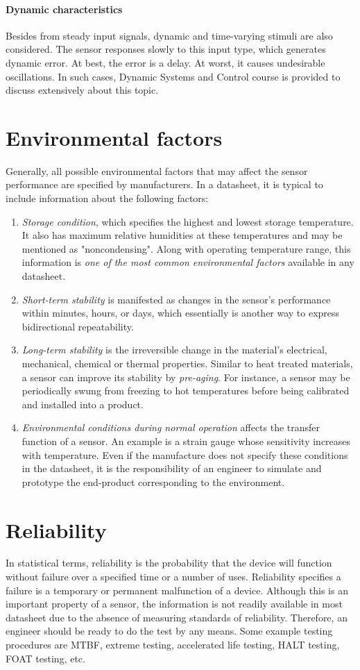 \paragraph{Dynamic characteristics}
Besides from steady input signals, dynamic and time-varying stimuli are also considered. The sensor responses slowly to this input type, which generates dynamic error. At best, the error is a delay. At worst, it causes undesirable oscillations. In such cases, Dynamic Systems and Control course is provided to discuss extensively about this topic.
\section{Environmental factors}
Generally, all possible environmental factors that may affect the sensor performance are specified by manufacturers. In a datasheet, it is typical to include information about the following factors:
\begin{enumerate}
	\item \textit{Storage condition}, which specifies the highest and lowest storage temperature. It also has maximum relative humidities at these temperatures and may be mentioned as "noncondensing". Along with operating temperature range, this information is \textit{one of the most common environmental factors} available in any datasheet. 
	\item \textit{Short-term stability} is manifested as changes in the sensor's performance within minutes, hours, or days, which essentially is another way to express bidirectional repeatability.
	\item \textit{Long-term stability} is the irreversible change in the material's electrical, mechanical, chemical or thermal properties. Similar to heat treated materials, a sensor can improve its stability by \textit{pre-aging}. For instance, a sensor may be periodically swung from freezing to hot temperatures before being calibrated and installed into a product.
	\item \textit{Environmental conditions during normal operation} affects the transfer function of a sensor. An example is a strain gauge whose sensitivity increases with temperature. Even if the manufacture does not specify these conditions in the datasheet, it is the responsibility of an engineer to simulate and prototype the end-product corresponding to the environment.
\end{enumerate}
\section{Reliability}
In statistical terms, reliability is the probability that the device will function without failure over a specified time or a number of uses. Reliability specifies a failure  is a temporary or permanent malfunction of a device. Although this is an important property of a sensor, the information is not readily available in most datasheet due to the absence of measuring standards of reliability. Therefore, an engineer should be ready to do the test by any means. Some example testing procedures are MTBF, extreme testing, accelerated life testing, HALT testing, FOAT testing, etc.
